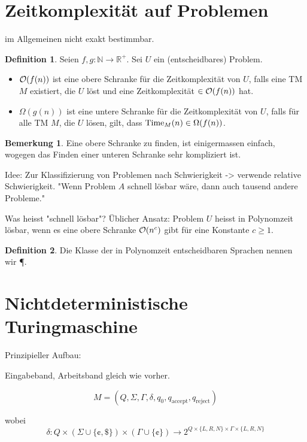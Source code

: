 \documentclass[11pt]{article} %
\theoremstyle{definition}
\newtheorem{definition}{Definition}
\newtheorem*{bemerkung}{Bemerkung}
\begin{document}
\section{Zeitkomplexität auf Problemen}

im Allgemeinen nicht exakt bestimmbar.

\begin{definition}
Seien $f, g : \mathbb{N} \rightarrow \mathbb{R}^+$. Sei $U$ ein (entscheidbares) Problem.
\begin{itemize}
\item $\mathcal{O}(f(n))$ ist eine obere Schranke für die Zeitkomplexität von $U$, falls eine TM $M$ existiert, die $U$ löst und eine Zeitkomplexität $\in \mathcal{O}(f(n))$ hat.
\item $\Omega(g(n))$ ist eine untere Schranke für die Zeitkomplexität von $U$, falls für alle TM $M$, die $U$ lösen, gilt, dass $\operatorname{Time}_M(n) \in \Omega(f(n))$.
\end{itemize}
\end{definition}

\begin{bemerkung}
Eine obere Schranke zu finden, ist einigermassen einfach, wogegen das Finden einer unteren Schranke sehr kompliziert ist.
\end{bemerkung}

Idee: Zur Klassifizierung von Problemen nach Schwierigkeit -> verwende relative Schwierigkeit. "Wenn Problem $A$ schnell lösbar wäre, dann auch tausend andere Probleme."

Was heisst "schnell lösbar"? Üblicher Ansatz: Problem $U$ heisst in Polynomzeit lösbar, wenn es eine obere Schranke $\mathcal{O}(n^c)$ gibt für eine Konstante $c \ge 1$.

\begin{definition}
Die Klasse der in Polynomzeit entscheidbaren Sprachen nennen wir \P.
\end{definition}

\section{Nichtdeterministische Turingmaschine}

Prinzipieller Aufbau:

Eingabeband, Arbeitsband gleich wie vorher.

\[
M = (Q, \Sigma, \Gamma, \delta, q_0, q_\textrm{accept}, q_\textrm{reject})
\]

wobei
\[
\delta: Q\times (\Sigma \cup \{\cent, \$\}) \times (\Gamma \cup \{\cent\}) \rightarrow 2^{Q\times \{L,R,N\} \times \Gamma \times \{L,R,N\}}
\]
\end{document}
